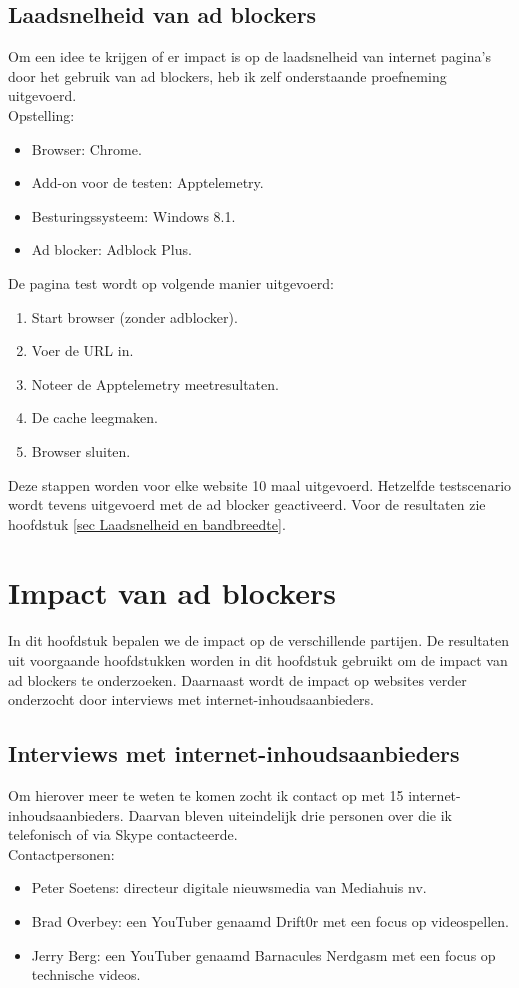 \documentclass[pdftex,a4paper,12pt,twoside]{report}
\begin{document}
\subsection{Laadsnelheid van ad blockers}
Om een idee te krijgen of er impact is op de laadsnelheid van internet pagina’s door het gebruik van ad blockers, heb ik zelf onderstaande proefneming uitgevoerd.
\\
Opstelling:
\begin{itemize}
	\item Browser: Chrome.
	\item Add-on voor de testen: Apptelemetry.
	\item Besturingssysteem: Windows 8.1.
	\item Ad blocker: Adblock Plus.
\end{itemize}
De pagina test wordt op volgende manier uitgevoerd:
\begin{enumerate}
	\item Start browser (zonder adblocker).
	\item Voer de URL in.
	\item Noteer de Apptelemetry meetresultaten.
	\item De cache leegmaken.
	\item Browser sluiten.
\end{enumerate}

Deze stappen worden voor elke website 10 maal uitgevoerd. Hetzelfde testscenario wordt tevens uitgevoerd met de ad blocker geactiveerd. Voor de resultaten zie hoofdstuk \ref{sec Laadsnelheid en bandbreedte}.

\section{Impact van ad blockers}
In dit hoofdstuk bepalen we de impact op de verschillende partijen. De resultaten uit voorgaande hoofdstukken worden in dit hoofdstuk gebruikt om de impact van ad blockers te onderzoeken. Daarnaast wordt de impact op websites verder onderzocht door interviews met internet-inhoudsaanbieders.
\subsection{Interviews met internet-inhoudsaanbieders}
Om hierover meer te weten te komen zocht ik contact op met 15 internet-inhoudsaanbieders. Daarvan bleven uiteindelijk drie personen over die ik telefonisch of via Skype contacteerde.
\\
Contactpersonen:
\begin{itemize}
	\item Peter Soetens: directeur digitale nieuwsmedia van Mediahuis nv.
	\item Brad Overbey: een YouTuber genaamd Drift0r met een focus op videospellen.
	\item Jerry Berg: een YouTuber genaamd Barnacules Nerdgasm met een focus op technische videos.
\end{itemize}
\end{document}
